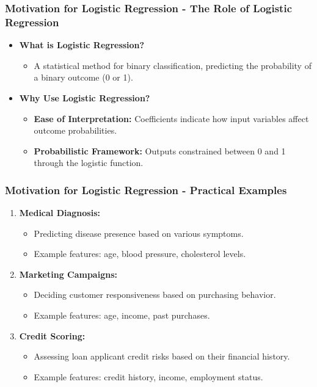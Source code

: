 \documentclass[aspectratio=169]{beamer}
\begin{document}
\begin{frame}[fragile]
    \frametitle{Motivation for Logistic Regression - The Role of Logistic Regression}
    \begin{itemize}
        \item \textbf{What is Logistic Regression?}
        \begin{itemize}
            \item A statistical method for binary classification, predicting the probability of a binary outcome (0 or 1).
        \end{itemize}
        \item \textbf{Why Use Logistic Regression?}
        \begin{itemize}
            \item \textbf{Ease of Interpretation:} Coefficients indicate how input variables affect outcome probabilities.
            \item \textbf{Probabilistic Framework:} Outputs constrained between 0 and 1 through the logistic function.
        \end{itemize}
    \end{itemize}
\end{frame}

\begin{frame}[fragile]
    \frametitle{Motivation for Logistic Regression - Practical Examples}
    \begin{enumerate}
        \item \textbf{Medical Diagnosis:}
        \begin{itemize}
            \item Predicting disease presence based on various symptoms.
            \item Example features: age, blood pressure, cholesterol levels.
        \end{itemize}
        \item \textbf{Marketing Campaigns:}
        \begin{itemize}
            \item Deciding customer responsiveness based on purchasing behavior.
            \item Example features: age, income, past purchases.
        \end{itemize}
        \item \textbf{Credit Scoring:}
        \begin{itemize}
            \item Assessing loan applicant credit risks based on their financial history.
            \item Example features: credit history, income, employment status.
        \end{itemize}
    \end{enumerate}
\end{frame}
\end{document}
